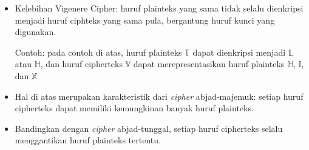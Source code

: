 \documentclass{article}
\begin{document}

\begin{itemize}
    \item Kelebihan Vigenere Cipher: huruf plainteks yang sama tidak selalu dienkripsi menjadi huruf ciphteks yang sama pula, bergantung huruf kunci yang digunakan.

    Contoh: pada contoh di atas, huruf plainteks $\mathbb{T}$ dapat dienkripsi menjadi $\mathbb{L}$ atau $\mathbb{H}$, dan huruf cipherteks $\mathbb{V}$ dapat merepresentasikan huruf plainteks $\mathbb{H}$, $\mathbb{I}$, dan $\mathbb{X}$

    \item Hal di atas merupakan karakteristik dari \textit{cipher} abjad-majemuk: setiap huruf cipherteks dapat memiliki kemungkinan banyak huruf plainteks.

    \item Bandingkan dengan \textit{cipher} abjad-tunggal, setiap huruf cipherteks selalu menggantikan huruf plainteks tertentu.
\end{itemize}
\end{document}
